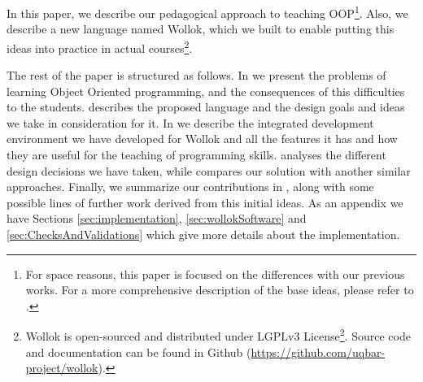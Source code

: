In this paper, we describe our pedagogical approach to teaching OOP\footnote{For space reasons, this paper is focused on the differences with our previous works. 
For a more comprehensive description of the base ideas, please refer to \cite{lombardi_instances_2007,lombardi_carlos_alumnos_2008,spigariol_lucas_ensenando_2013}.}.
Also, we describe a new language named Wollok, which we built to enable putting this ideas into practice in actual courses\footnote{Wollok is open-sourced and distributed under LGPLv3 License\footnote{http://www.gnu.org/copyleft/lgpl.html}.
Source code and documentation can be found in Github (\url{https://github.com/uqbar-project/wollok}).}.


\medskip 
The rest of the paper is structured as follows. In  we present the problems of learning Object Oriented programming, and the consequences of this difficulties to the students.  describes the proposed language and the design goals and ideas we take in consideration for it. In  we describe the integrated development environment we have developed for Wollok and all the features it has and how they are useful for the teaching of programming skills.  analyses the different design decisions we have taken, while  compares our solution with another similar approaches. Finally, we summarize our contributions in ,
along with some possible lines of further work derived from this initial ideas. As an appendix we have Sections \ref{sec:implementation}, \ref{sec:wollokSoftware} and \ref{sec:ChecksAndValidations} which give more details about the implementation.


